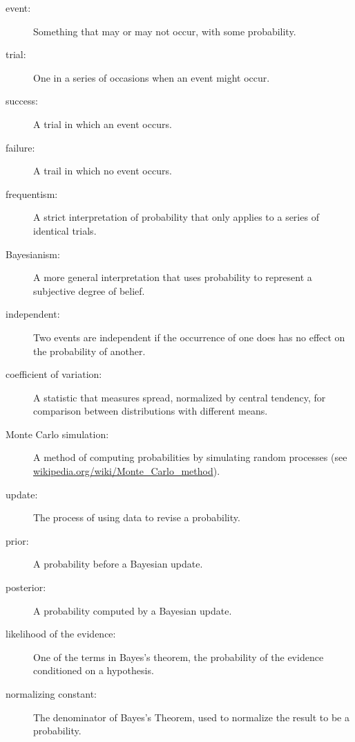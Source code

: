 \documentclass[12pt]{book}
\begin{document}
\begin{description}

\item[event:] Something that may or may not occur, with some probability.

\item[trial:] One in a series of occasions when an event might occur.

\item[success:] A trial in which an event occurs.

\item[failure:] A trail in which no event occurs.

\item[frequentism:] A strict interpretation of probability that only
applies to a series of identical trials.

\item[Bayesianism:] A more general interpretation that uses
probability to represent a subjective degree of belief.

\item[independent:] Two events are independent if the occurrence of
one does has no effect on the probability of another.

\item[coefficient of variation:] A statistic that measures spread,
normalized by central tendency, for comparison between distributions
with different means.

\item[Monte Carlo simulation:] A method of computing probabilities by
  simulating random processes (see
  \url{wikipedia.org/wiki/Monte_Carlo_method}).

\item[update:] The process of using data to revise a probability.

\item[prior:] A probability before a Bayesian update.

\item[posterior:] A probability computed by a Bayesian update.

\item[likelihood of the evidence:] One of the terms in Bayes's
  theorem, the probability of the evidence conditioned on a
  hypothesis.

\item[normalizing constant:] The denominator of Bayes's Theorem,
  used to normalize the result to be a probability.

\end{description}
\end{document}
